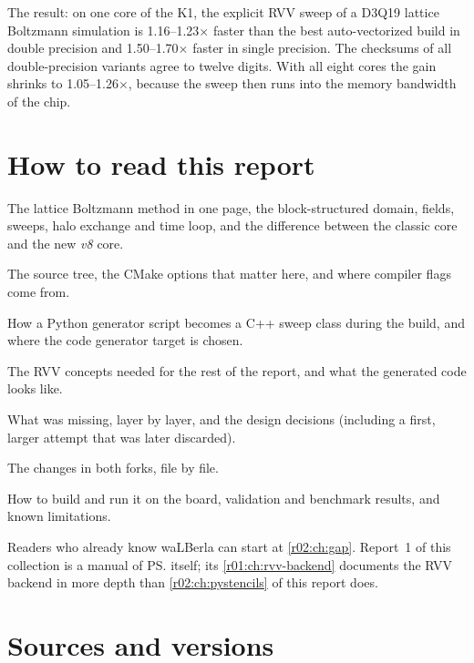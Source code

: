 The result: on one core of the K1, the explicit RVV sweep of a D3Q19 lattice
Boltzmann simulation is 1.16--1.23$\times$ faster than the best auto-vectorized build in
double precision and 1.50--1.70$\times$ faster in single precision. The checksums of all
double-precision variants agree to twelve digits. With all eight cores the gain shrinks
to 1.05--1.26$\times$, because the sweep then runs into the memory bandwidth of the
chip.

\section{How to read this report}

\begin{description}[style=nextline]
  \item[\Cref{r02:ch:walberla}: waLBerla in a nutshell] The lattice Boltzmann
    method in one page, the block-structured domain, fields, sweeps, halo exchange and
    time loop, and the difference between the classic core and the new \emph{v8} core.
  \item[\Cref{r02:ch:structure}: Project structure and build system] The source tree,
    the CMake options that matter here, and where compiler flags come from.
  \item[\Cref{r02:ch:codegen}: Code generation] How a Python generator script becomes
    a C++ sweep class during the build, and where the code generator target is chosen.
  \item[\Cref{r02:ch:rvv-primer}: RVV and the \ps{} backend] The RVV concepts needed
    for the rest of the report, and what the generated code looks like.
  \item[\Cref{r02:ch:gap,r02:ch:design}] What was missing, layer by layer, and the
    design decisions (including a first, larger attempt that was later discarded).
  \item[\Cref{r02:ch:pystencils,r02:ch:wlb-changes}] The changes in both forks, file by
    file.
  \item[\Cref{r02:ch:build-run,r02:ch:results,r02:ch:limitations}] How to build and run
    it on the board, validation and benchmark results, and known limitations.
\end{description}
Readers who already know waLBerla can start at \cref{r02:ch:gap}. Report~1 of this
collection is a manual of \ps{} itself; its \cref{r01:ch:rvv-backend} documents the
RVV backend in more depth than \cref{r02:ch:pystencils} of this report does.

\section{Sources and versions}\label{r02:sec:versions}

